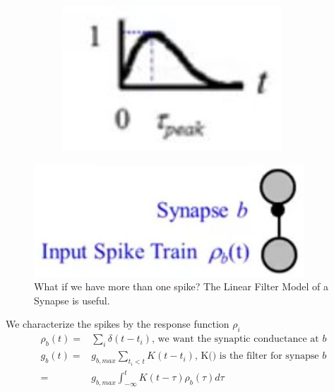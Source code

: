 \documentclass[]{article}
\begin{document}
\begin{figure}[H]
\begin{subfigure}[t]{0.9\textwidth}
		\includegraphics[width=0.9\textwidth]{PS3}
	\end{subfigure}
\end{figure}

\begin{figure}[H]
	\begin{center}
		\caption[What if we have more than one spike?]{What if we have more than one spike? The Linear Filter Model of a Synapse is useful.}
		\includegraphics[width=0.9\textwidth]{LinearFilter}
	\end{center}
\end{figure}

We characterize the spikes by the response function $\rho_i$
\begin{align*}
	\rho_b(t) =& \sum_{i} \delta(t-t_i) \text{, we want the synaptic conductance at $b$}\\
	g_b(t) =& g_{b,max}\sum_{t_i<t} K(t-t_i) \text{, K() is the filter for synapse $b$}\\
	=& g_{b,max}\int_{-\infty}^{t} K(t-\tau) \rho_b(\tau) d\tau
\end{align*}
\end{document}
